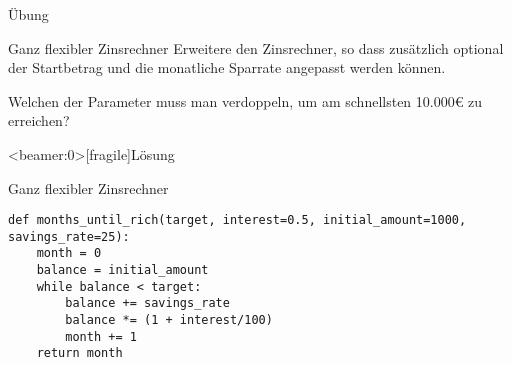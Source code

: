 \begin{frame}{Übung}
\begin{block}{Ganz flexibler Zinsrechner}
\vspace{2pt}
Erweitere den Zinsrechner, so dass zusätzlich optional der Startbetrag und die monatliche Sparrate angepasst werden können. 	

Welchen der Parameter muss man verdoppeln, um am schnellsten 10.000€ zu erreichen? 
\end{block}
\end{frame}

\begin{frame}<beamer:0>[fragile]{Lösung}

\begin{solutionblock}{Ganz flexibler Zinsrechner}
\begin{verbatim}
def months_until_rich(target, interest=0.5, initial_amount=1000, savings_rate=25):
    month = 0
    balance = initial_amount
    while balance < target:
        balance += savings_rate
        balance *= (1 + interest/100)
        month += 1
    return month
\end{verbatim}
\end{solutionblock}
\end{frame}






























































